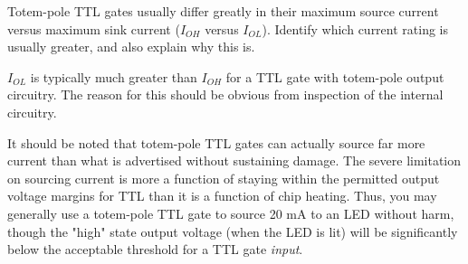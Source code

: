 

Totem-pole TTL gates usually differ greatly in their maximum source current versus maximum sink current ($I_{OH}$ versus $I_{OL}$).  Identify which current rating is usually greater, and also explain why this is.







$I_{OL}$ is typically much greater than $I_{OH}$ for a TTL gate with totem-pole output circuitry.  The reason for this should be obvious from inspection of the internal circuitry.







It should be noted that totem-pole TTL gates can actually source far more current than what is advertised without sustaining damage.  The severe limitation on sourcing current is more a function of staying within the permitted output voltage margins for TTL than it is a function of chip heating.  Thus, you may generally use a totem-pole TTL gate to source 20 mA to an LED without harm, though the "high" state output voltage (when the LED is lit) will be significantly below the acceptable threshold for a TTL gate {\it input}.




